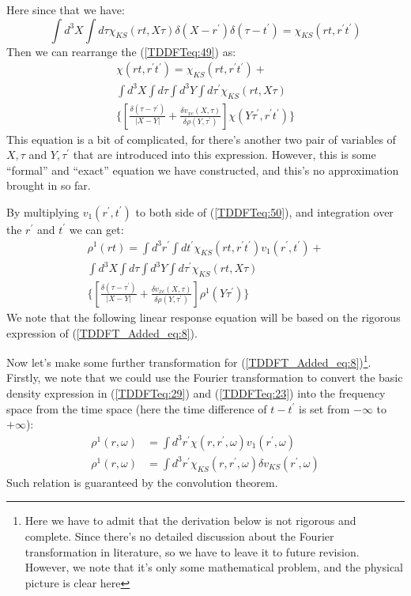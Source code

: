 Here since that we have:
\begin{equation}\label{}
\int d^{3}X\int d\tau  \chi_{KS}(rt, X\tau) \delta
(X-r^{'})\delta(\tau-t^{'}) = \chi_{KS}(rt, r^{'}t^{'})
\end{equation}
Then we can rearrange the (\ref{TDDFTeq:49}) as:
\begin{multline}\label{TDDFTeq:50}
\chi(rt, r^{'}t^{'}) = \chi_{KS}(rt, r^{'}t^{'}) + \\
\int d^{3}X\int d\tau\int d^{3}Y\int d\tau^{'}  \chi_{KS}(rt,
X\tau) \\
\Bigg\{\left[\frac{\delta(\tau-\tau^{'})}{|X-Y|} + \frac{\delta
v_{xc}(X,\tau)}{\delta \rho(Y,\tau^{'})}\right]\chi(Y\tau^{'},
r^{'}t^{'}) \Bigg\}
\end{multline}
This equation is a bit of complicated, for there's another two pair
of variables of $X, \tau$ and $Y, \tau^{'}$ that are introduced into
this expression. However, this is some ``formal'' and ``exact''
equation we have constructed, and this's no approximation brought in
so far.

By multiplying $v_{1}(r^{'},t^{'})$ to both side of
(\ref{TDDFTeq:50}), and integration over the $r^{'}$ and $t^{'}$ we
can get:
\begin{multline}
  \label{TDDFT_Added_eq:8}
  \rho^{1}(rt) = \int d^{3}r^{'}\int dt^{'}\chi_{KS}(rt,
  r^{'}t^{'})v_{1}(r^{'},t^{'})
  + \\
  \int d^{3}X\int d\tau\int d^{3}Y\int d\tau^{'} \chi_{KS}(rt,
  X\tau) \\
  \Bigg\{\left[\frac{\delta(\tau-\tau^{'})}{|X-Y|} + \frac{\delta
      v_{xc}(X,\tau)}{\delta
      \rho(Y,\tau^{'})}\right]\rho^{1}(Y\tau^{'}) \Bigg\}
\end{multline}
We note that the following linear response equation will be based on
the rigorous expression of (\ref{TDDFT_Added_eq:8}).

Now let's make some further transformation for
(\ref{TDDFT_Added_eq:8})\footnote{Here we have to admit that the
derivation below is not rigorous and complete. Since there's no
detailed discussion about the Fourier transformation in literature, so
we have to leave it to future revision. However, we note that it's
only some mathematical problem, and the physical picture is clear
here}. Firstly, we note that we
could use the Fourier
transformation to convert the basic density expression in
(\ref{TDDFTeq:29}) and (\ref{TDDFTeq:23}) into the frequency space
from the time space (here the time difference of $t-t^{'}$ is set from
$-\infty$ to $+\infty$):
\begin{align}\label{TDDFTeq:22}
\rho^{1}(r,\omega) &= \int
d^{3}r^{'}\chi(r,r^{'},\omega)v_{1}(r^{'},\omega)
\nonumber
\\
\rho^{1}(r,\omega) &= \int
d^{3}r^{'}\chi_{KS}(r,r^{'},\omega)\delta
v_{KS}(r^{'},\omega)
\end{align}
Such relation is guaranteed by the convolution theorem.


